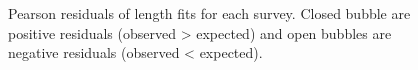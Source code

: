 \documentclass[
]{scrartcl}
\begin{document}
\begin{figure}[H]


\caption{\label{fig-peasrson-resids-survey}Pearson residuals of length
fits for each survey. Closed bubble are positive residuals (observed
\textgreater{} expected) and open bubbles are negative residuals
(observed \textless{} expected).}

\end{figure}%
\end{document}
